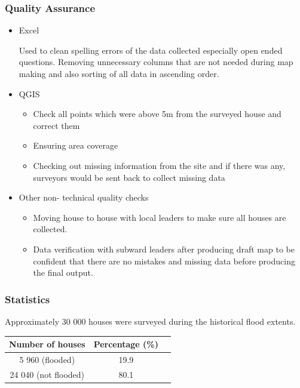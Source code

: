 \documentclass[a4paper,12pt,twoside]{article}
\begin{document}
\subsubsection{Quality Assurance}
    \begin{itemize}
    \item Excel
    \
    
     Used  to clean spelling errors of the data collected especially open ended questions. Removing unnecessary columns that are not needed during map making and also sorting of all data in ascending order.
    \item QGIS
        \begin{itemize}
             \item Check all points which  were above 5m from the surveyed house and correct them
            \item Ensuring area coverage
            \item Checking out missing information from the site and if there was any, surveyors would be sent back to collect missing data
        \end{itemize}
    \item Other non- technical quality checks
        \begin{itemize}
            \item Moving house to house with local leaders to make sure all houses are collected.
            \item Data verification with subward leaders after producing draft map to be confident that there are no mistakes and missing data before producing the final output.
        \end{itemize}
    \end{itemize}

\subsubsection{Statistics}
Approximately 30 000 houses were surveyed during the historical flood extents.

\begin{center}    
\begin{tabular}{|c|c|c|}
\hline
Number of houses & Percentage (\%)\\
\hline
5 960 (flooded) & 19.9\\
24 040 (not flooded) & 80.1\\
\hline
\end{tabular}
\end{center}
\end{document}
